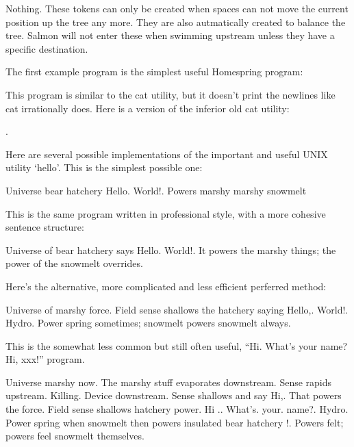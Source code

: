 \documentclass[10pt]{article}
\begin{document}

Nothing. These tokens can only be created when spaces can not move the current position up the tree any more. They are also autmatically created to balance the tree. Salmon will not enter these when swimming upstream unless they have a specific destination.

\newpage
{}

The first example program is the simplest useful Homespring program:

\begin{verbatim*}

\end{verbatim*}

This program is similar to the cat utility, but it doesn't print the newlines like cat irrationally does. Here is a version of the inferior old cat utility:

\begin{verbatim*}

.
\end{verbatim*}

Here are several possible implementations of the important and useful UNIX utility `hello'. This is the simplest possible one:

\begin{verbatim*}
Universe bear hatchery Hello. World!.
 Powers   marshy marshy snowmelt
\end{verbatim*}

This is the same program written in professional style, with a more cohesive sentence structure:

\begin{verbatim*}
Universe of bear hatchery says Hello. World!.
 It   powers     the marshy things;
the power of the snowmelt overrides.
\end{verbatim*}

Here's the alternative, more complicated and less efficient perferred method:

\begin{verbatim*}
Universe of marshy force. Field sense
shallows the hatchery saying Hello,. World!.
 Hydro. Power spring  sometimes; snowmelt
      powers   snowmelt always.
\end{verbatim*}

This is the somewhat less common but still often useful, ``Hi. What's your name? Hi, xxx!'' program.

\begin{verbatim*}
Universe marshy now. The marshy stuff evaporates downstream. Sense rapids
upstream. Killing. Device downstream. Sense shallows and say Hi,. 
   That powers the     force. Field sense shallows hatchery power.
Hi .. What's. your. name?. 
  Hydro. Power spring  when snowmelt then       powers
    insulated bear hatchery !.
 Powers felt;       powers feel     snowmelt themselves.
\end{verbatim*}
\end{document}
